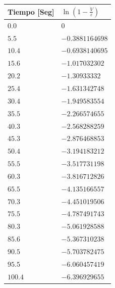 \documentclass[twocolumn, 12pt]{article}
\begin{document}
\begin{table}[H]
    \centering
    \begin{tabularx}{0.9\linewidth}{|>{\centering\arraybackslash}X|>{\centering\arraybackslash}X|}

        \hline
        Tiempo \textbf{[Seg]} & $\ln (1- \frac{V}{\varepsilon})$ \\\hline
        $0.0$                 & $0$                              \\\hline
        $5.5$                 & $-0.3881164698$                  \\\hline
        $10.4$                & $-0.6938140695$                  \\\hline
        $15.6$                & $-1.017032302$                   \\\hline
        $20.2$                & $-1.30933332$                    \\\hline
        $25.4$                & $-1.631342748$                   \\\hline
        $30.4$                & $-1.949583554$                   \\\hline
        $35.5$                & $-2.266574655$                   \\\hline
        $40.3$                & $-2.568288259$                   \\\hline
        $45.3$                & $-2.876468853$                   \\\hline
        $50.4$                & $-3.194183212$                   \\\hline
        $55.5$                & $-3.517731198$                   \\\hline
        $60.3$                & $-3.816712826$                   \\\hline
        $65.5$                & $-4.135166557$                   \\\hline
        $70.3$                & $-4.451019506$                   \\\hline
        $75.5$                & $-4.787491743$                   \\\hline
        $80.3$                & $-5.061928588$                   \\\hline
        $85.6$                & $-5.367310238$                   \\\hline
        $90.5$                & $-5.703782475$                   \\\hline
        $95.5$                & $-6.060457419$                   \\\hline
        $100.4$               & $-6.396929655$                   \\\hline

    \end{tabularx}
\end{table}
\end{document}
